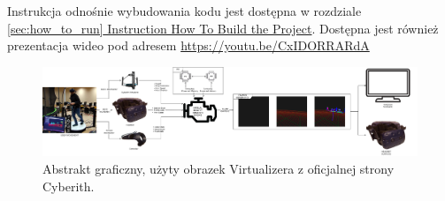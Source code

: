 Instrukcja odnośnie wybudowania kodu jest dostępna w rozdziale \hyperref[sec:how_to_run]{\ref*{sec:how_to_run} Instruction How To Build the Project}. Dostępna jest również prezentacja wideo pod adresem \href{https://youtu.be/CxIDORRARdA}{https://youtu.be/CxIDORRARdA}

\begin{figure}[H]
  \includegraphics[width=\linewidth]{figures/graphicalAbstract.png}
  \caption{Abstrakt graficzny, użyty obrazek Virtualizera z oficjalnej strony Cyberith\cite{virtualizer_image}.}
\end{figure}

